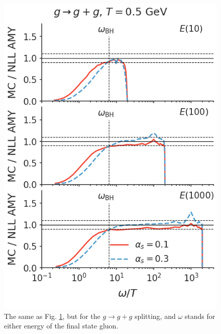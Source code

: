 \documentclass[aps, prc, reprint, amsmath, groupedaddress, nofootinbib]{revtex4-1}
\begin{document}
\begin{appendices}
\begin{figure}[t]
\includegraphics[width=\columnwidth]{spectrum_E_g2gg.png}
\caption{The same as Fig. \ref{fig:g2gg}, but for the $g\rightarrow g+g$ splitting, and $\omega$ stands for either energy of the final state gluon.}
\label{fig:g2gg}
\end{figure}


\end{appendices}
\end{document}
